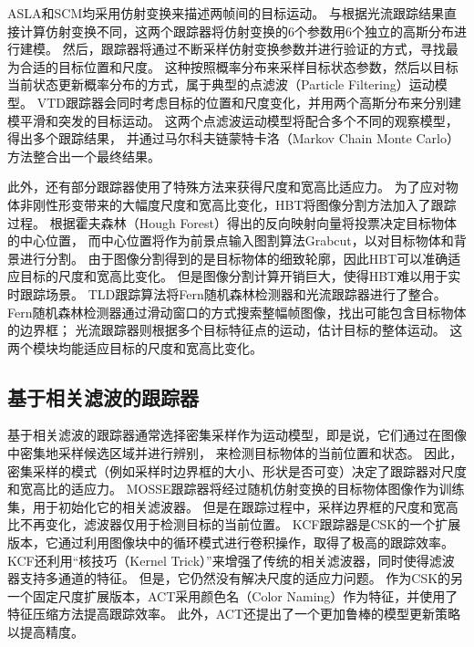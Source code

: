 ASLA和SCM均采用仿射变换来描述两帧间的目标运动。
与\cite{survey51}根据光流跟踪结果直接计算仿射变换不同，这两个跟踪器将仿射变换的6个参数用6个独立的高斯分布进行建模。
然后，跟踪器将通过不断采样仿射变换参数并进行验证的方式，寻找最为合适的目标位置和尺度。
这种按照概率分布来采样目标状态参数，然后以目标当前状态更新概率分布的方式，属于典型的点滤波（Particle Filtering）运动模型。
VTD跟踪器会同时考虑目标的位置和尺度变化，并用两个高斯分布来分别建模平滑和突发的目标运动。
这两个点滤波运动模型将配合多个不同的观察模型，得出多个跟踪结果，
并通过马尔科夫链蒙特卡洛（Markov Chain Monte Carlo）方法整合出一个最终结果。

此外，还有部分跟踪器使用了特殊方法来获得尺度和宽高比适应力。
为了应对物体非刚性形变带来的大幅度尺度和宽高比变化，HBT将图像分割方法加入了跟踪过程。
根据霍夫森林（Hough Forest）得出的反向映射向量将投票决定目标物体的中心位置，
而中心位置将作为前景点输入图割算法Grabcut，以对目标物体和背景进行分割。
由于图像分割得到的是目标物体的细致轮廓，因此HBT可以准确适应目标的尺度和宽高比变化。
但是图像分割计算开销巨大，使得HBT难以用于实时跟踪场景。
TLD跟踪算法将Fern随机森林检测器和光流跟踪器进行了整合。
Fern随机森林检测器通过滑动窗口的方式搜索整幅帧图像，找出可能包含目标物体的边界框；
光流跟踪器则根据多个目标特征点的运动，估计目标的整体运动。
这两个模块均能适应目标的尺度和宽高比变化。

\subsection{基于相关滤波的跟踪器}
基于相关滤波的跟踪器通常选择密集采样作为运动模型，即是说，它们通过在图像中密集地采样候选区域并进行辨别，
来检测目标物体的当前位置和状态。
因此，密集采样的模式（例如采样时边界框的大小、形状是否可变）决定了跟踪器对尺度和宽高比的适应力。
MOSSE跟踪器将经过随机仿射变换的目标物体图像作为训练集，用于初始化它的相关滤波器。
但是在跟踪过程中，采样边界框的尺度和宽高比不再变化，滤波器仅用于检测目标的当前位置。
KCF跟踪器是CSK的一个扩展版本，它通过利用图像块中的循环模式进行卷积操作，取得了极高的跟踪效率。
KCF还利用``核技巧（Kernel Trick）''来增强了传统的相关滤波器，同时使得滤波器支持多通道的特征。
但是，它仍然没有解决尺度的适应力问题。
作为CSK的另一个固定尺度扩展版本，ACT采用颜色名（Color Naming）作为特征，并使用了特征压缩方法提高跟踪效率。
此外，ACT还提出了一个更加鲁棒的模型更新策略以提高精度。


